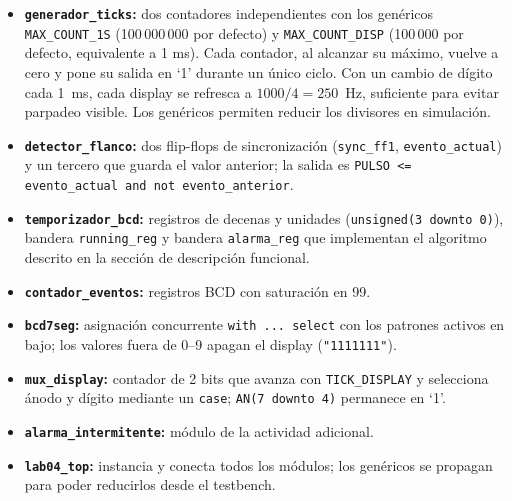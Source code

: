 \documentclass[letterpaper,12pt]{article}
\begin{document}
\begin{itemize}
    \item \textbf{\texttt{generador\_ticks}:} dos contadores independientes con los genéricos \texttt{MAX\_COUNT\_1S} (100\,000\,000 por defecto) y \texttt{MAX\_COUNT\_DISP} (100\,000 por defecto, equivalente a 1 ms). Cada contador, al alcanzar su máximo, vuelve a cero y pone su salida en `1' durante un único ciclo. Con un cambio de dígito cada 1~ms, cada display se refresca a $1000/4 = 250$~Hz, suficiente para evitar parpadeo visible. Los genéricos permiten reducir los divisores en simulación.
    \item \textbf{\texttt{detector\_flanco}:} dos flip-flops de sincronización (\texttt{sync\_ff1}, \texttt{evento\_actual}) y un tercero que guarda el valor anterior; la salida es \texttt{PULSO <= evento\_actual and not evento\_anterior}.
    \item \textbf{\texttt{temporizador\_bcd}:} registros de decenas y unidades (\texttt{unsigned(3 downto 0)}), bandera \texttt{running\_reg} y bandera \texttt{alarma\_reg} que implementan el algoritmo descrito en la sección de descripción funcional.
    \item \textbf{\texttt{contador\_eventos}:} registros BCD con saturación en 99.
    \item \textbf{\texttt{bcd7seg}:} asignación concurrente \texttt{with ... select} con los patrones activos en bajo; los valores fuera de 0--9 apagan el display (\texttt{"1111111"}).
    \item \textbf{\texttt{mux\_display}:} contador de 2 bits que avanza con \texttt{TICK\_DISPLAY} y selecciona ánodo y dígito mediante un \texttt{case}; \texttt{AN(7 downto 4)} permanece en `1'.
    \item \textbf{\texttt{alarma\_intermitente}:} módulo de la actividad adicional.
    \item \textbf{\texttt{lab04\_top}:} instancia y conecta todos los módulos; los genéricos se propagan para poder reducirlos desde el testbench.
\end{itemize}

\end{document}
